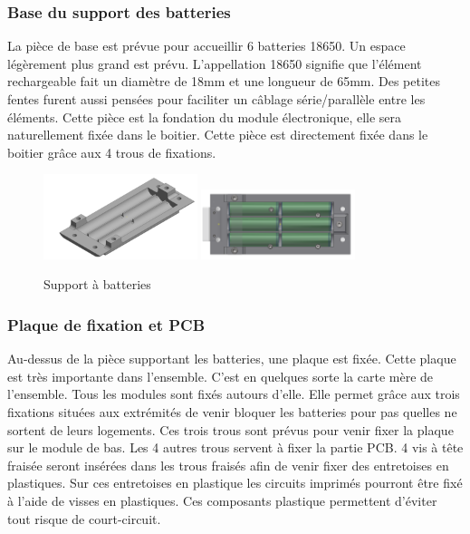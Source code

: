 \subsubsection{Base du support des batteries}

La pièce de base est prévue pour accueillir 6 batteries 18650. Un espace légèrement plus grand est 
prévu. L’appellation 18650 signifie que l’élément rechargeable fait un diamètre de 18mm et une longueur 
de 65mm. Des petites fentes furent aussi pensées pour faciliter un câblage série/parallèle entre les 
éléments. Cette pièce est la fondation du module électronique, elle sera naturellement fixée dans le 
boitier. Cette pièce est directement fixée dans le boitier grâce aux 4 trous de fixations.

\begin{figure}[H]
    \centering
    \includegraphics[width=0.4\textwidth]{Images/photos_PGA/moduleFondbat.PNG}
    \includegraphics[width=0.4\textwidth]{Images/photos_PGA/bateriebl.PNG}
    \caption{Support à batteries}
    \label{fig:supportbatteries}
\end{figure}

\subsubsection{Plaque de fixation et PCB}

Au-dessus de la pièce supportant les batteries, une plaque est fixée. Cette plaque est très importante 
dans l’ensemble. C’est en quelques sorte la carte mère de l’ensemble. Tous les modules sont fixés autours 
d’elle.  Elle permet grâce aux trois fixations situées aux extrémités de venir bloquer les batteries 
pour pas quelles ne sortent de leurs logements. Ces trois trous sont prévus pour venir fixer la plaque 
sur le module de bas.  Les 4 autres trous servent à fixer la partie PCB. 4 vis à tête fraisée seront 
insérées dans les trous fraisés afin de venir fixer des entretoises en plastiques. Sur ces entretoises 
en plastique les circuits imprimés pourront être fixé à l’aide de visses en plastiques. Ces composants 
plastique permettent d’éviter tout risque de court-circuit.

